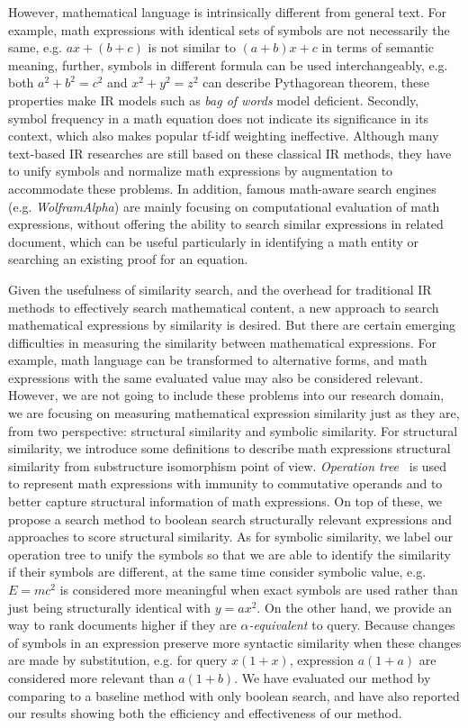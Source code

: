 \documentclass{acm_proc_article-sp}
\begin{document}
However, mathematical language is intrinsically different from general text.
For example, math expressions with identical sets of symbols are not necessarily the same, e.g. $ax+(b+c)$ is not similar to $(a+b)x+c$ in terms of semantic meaning,
further, symbols in different formula can be used interchangeably, e.g. both $a^2+b^2=c^2$ and $x^2+y^2=z^2$ can describe Pythagorean theorem,
these properties make IR models such as \textit{bag of words} model deficient. 
Secondly, symbol frequency in a math equation does not indicate its significance in its context, which also makes popular tf-idf weighting ineffective. 
Although many text-based IR researches are still based on these classical IR methods, they have to unify symbols and normalize math expressions by augmentation to accommodate these problems.
In addition, famous math-aware search engines (e.g. \textit{WolframAlpha}) are mainly focusing on computational evaluation of math expressions, without offering the ability to search similar expressions in related document, 
which can be useful particularly in identifying a math entity or searching an existing proof for an equation.

Given the usefulness of similarity search, and the overhead for traditional IR methods to effectively search mathematical content, 
a new approach to search mathematical expressions by similarity is desired.
But there are certain emerging difficulties in measuring the similarity between mathematical expressions.
For example, math language can be transformed to alternative forms, 
and math expressions with the same evaluated value may also be considered relevant. 
However, we are not going to include these problems into our research domain, we are focusing on measuring mathematical expression similarity just as they are, from two perspective: structural similarity and symbolic similarity.
For structural similarity, we introduce some definitions to describe math expressions structural similarity from substructure isomorphism point of view. 
\textit{Operation tree}~\cite{goodsurvey} is used to represent math expressions with immunity to commutative operands and to better capture structural information of math expressions. 
On top of these, we propose a search method to boolean search structurally relevant expressions and approaches to score structural similarity.
As for symbolic similarity, we label our operation tree to unify the symbols so that we are able to identify the similarity if their symbols are different,
at the same time consider symbolic value, e.g. $E=mc^2$ is considered more meaningful when exact symbols are used rather than just being structurally identical with $y=ax^2$.
On the other hand, we provide an way to rank documents higher if they are \textit{$\alpha$-equivalent} to query.
Because changes of symbols in an expression preserve more syntactic similarity when these changes are made by substitution, e.g. for query $x(1+x)$, expression $a(1+a)$ are considered more relevant than $a(1+b)$. 
We have evaluated our method by comparing to a baseline method with only boolean search, and have also reported our results showing both the efficiency and effectiveness of our method.
\end{document}
